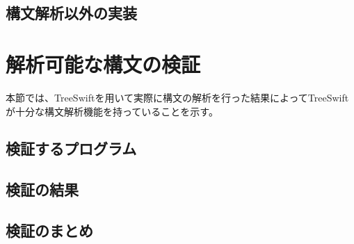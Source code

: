 \subsection{構文解析以外の実装}


\section{解析可能な構文の検証}

本節では、TreeSwiftを用いて実際に構文の解析を行った結果によってTreeSwiftが十分な構文解析機能を持っていることを示す。

\subsection{検証するプログラム}

\subsection{検証の結果}
\label{treeswift:test:result}

\subsection{検証のまとめ}

